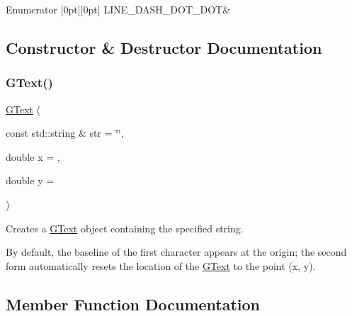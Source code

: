 \begin{DoxyEnumFields}{Enumerator}
[0pt][0pt]{}\mbox{\label{classGObject_a86e0f5648542856159bb40775c854aa7aabf4053a73eafa7ba2b7e6d664c74c1d}} 
L\+I\+N\+E\+\_\+\+D\+A\+S\+H\+\_\+\+D\+O\+T\+\_\+\+D\+OT&\\
\hline

\end{DoxyEnumFields}


\subsection{Constructor \& Destructor Documentation}
\mbox{\label{classGText_ad86d52c255aab367ddc6c54baff70846}} 
\subsubsection{\texorpdfstring{G\+Text()}{GText()}}
{\footnotesize\ttfamily \mbox{\hyperlink{classGText}{G\+Text}} (\begin{DoxyParamCaption}\item[{const std\+::string \&}]{str = {\ttfamily \char`\"{}\char`\"{}},  }\item[{double}]{x = {},  }\item[{double}]{y = {} }\end{DoxyParamCaption})}



Creates a {\ttfamily \mbox{\hyperlink{classGText}{G\+Text}}} object containing the specified string. 

By default, the baseline of the first character appears at the origin; the second form automatically resets the location of the {\ttfamily \mbox{\hyperlink{classGText}{G\+Text}}} to the point ({\ttfamily x}, {\ttfamily y}). 

\subsection{Member Function Documentation}
\mbox{\label{classGObject_abb6a5d7c03e6eaaae97264c4799ce7c3}} 
